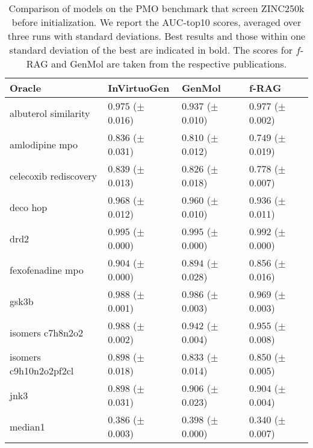\begin{table}[ht]
\centering
\caption{Comparison of models on the PMO benchmark that screen ZINC250k before initialization. We report the AUC-top10 scores, averaged over three runs with standard deviations. Best results and those within one standard deviation of the best are indicated in bold. The scores for $f$-RAG \citep{lee2024moleculegenerationfragmentretrieval} and GenMol \cite{genmol} are taken from the respective publications.}
\label{tab:no_prescreen} 
\begin{tabularx}{\linewidth}{l|>{}p{2.2cm} Y Y }
\toprule
Oracle & InVirtuoGen & GenMol & f-RAG \\
\midrule
\small{albuterol similarity} & $\mathbf{0.975}$ {\tiny ($\pm$ 0.016)} & $0.937$ {\tiny ($\pm$ 0.010)} & $\mathbf{0.977}$ {\tiny ($\pm$ 0.002)} \\
\small{amlodipine mpo} & $\mathbf{0.836}$ {\tiny ($\pm$ 0.031)} & $\mathbf{0.810}$ {\tiny ($\pm$ 0.012)} & $0.749$ {\tiny ($\pm$ 0.019)} \\
\small{celecoxib rediscovery} & $\mathbf{0.839}$ {\tiny ($\pm$ 0.013)} & $0.826$ {\tiny ($\pm$ 0.018)} & $0.778$ {\tiny ($\pm$ 0.007)} \\
\small{deco hop} & $\mathbf{0.968}$ {\tiny ($\pm$ 0.012)} & $\mathbf{0.960}$ {\tiny ($\pm$ 0.010)} & $0.936$ {\tiny ($\pm$ 0.011)} \\
\small{drd2} & $\mathbf{0.995}$ {\tiny ($\pm$ 0.000)} & $\mathbf{0.995}$ {\tiny ($\pm$ 0.000)} & $0.992$ {\tiny ($\pm$ 0.000)} \\
\small{fexofenadine mpo} & $\mathbf{0.904}$ {\tiny ($\pm$ 0.000)} & $0.894$ {\tiny ($\pm$ 0.028)} & $0.856$ {\tiny ($\pm$ 0.016)} \\
\small{gsk3b} & $\mathbf{0.988}$ {\tiny ($\pm$ 0.001)} & $0.986$ {\tiny ($\pm$ 0.003)} & $0.969$ {\tiny ($\pm$ 0.003)} \\
\small{isomers c7h8n2o2} & $\mathbf{0.988}$ {\tiny ($\pm$ 0.002)} & $0.942$ {\tiny ($\pm$ 0.004)} & $0.955$ {\tiny ($\pm$ 0.008)} \\
\small{isomers c9h10n2o2pf2cl} & $\mathbf{0.898}$ {\tiny ($\pm$ 0.018)} & $0.833$ {\tiny ($\pm$ 0.014)} & $0.850$ {\tiny ($\pm$ 0.005)} \\
\small{jnk3} & $\mathbf{0.898}$ {\tiny ($\pm$ 0.031)} & $\mathbf{0.906}$ {\tiny ($\pm$ 0.023)} & $\mathbf{0.904}$ {\tiny ($\pm$ 0.004)} \\
\small{median1} & $0.386$ {\tiny ($\pm$ 0.003)} & $\mathbf{0.398}$ {\tiny ($\pm$ 0.000)} & $0.340$ {\tiny ($\pm$ 0.007)} \\

\end{tabularx}
\end{table}
